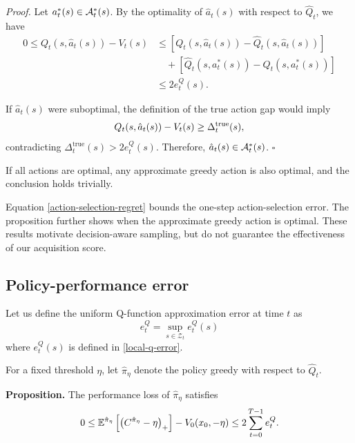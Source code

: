 \textit{Proof.}
Let $a_t^*(s)\in\mathcal{A}_t^*(s)$. By the optimality of $\hat a_t(s)$ with respect to $\hat Q_t$, we have
\begin{equation}
	\begin{array}{rl}
		0 \leq Q_t(s,\hat a_t(s))-V_t(s) &\displaystyle\leq
		\left[
		Q_t(s,\hat a_t(s))
		-\hat Q_t(s,\hat a_t(s))
		\right]\\[4pt]
		&\displaystyle\quad+
		\left[
		\hat Q_t(s,a_t^*(s))
		-Q_t(s,a_t^*(s))
		\right]\\[4pt]
		&\displaystyle\leq 2e_t^Q(s).
	\end{array}
	\label{action-selection-regret}
\end{equation}

If $\hat a_t(s)$ were suboptimal, the definition
of the true action gap would imply
\begin{equation}
	Q_t(s,\hat a_t(s))-V_t(s)
	\geq\Delta_t^{\text{true}}(s),
	\notag
\end{equation}
contradicting
$\Delta_t^{\text{true}}(s)>2e_t^Q(s)$.
Therefore,
$\hat a_t(s)\in\mathcal{A}_t^*(s)$.
\hfill$\square$

If all actions are optimal, any approximate greedy action is also optimal, and the conclusion holds trivially.

Equation \eqref{action-selection-regret} bounds the one-step action-selection error. The proposition further shows when the approximate greedy action is optimal. These results motivate decision-aware sampling, but do not guarantee the effectiveness of our acquisition score.


\subsection{Policy-performance error}
\label{method:policy-error}

Let us define the uniform Q-function approximation error
at time $t$ as
\begin{equation}
	e_t^Q = \sup_{s \in \mathcal{Z}_t} e_t^Q(s)
	\label{uniform-q-error}
\end{equation}
where $e_t^Q(s)$ is defined in \eqref{local-q-error}.

For a fixed threshold $\eta$, let $\hat{\pi}_{\eta}$ denote the policy greedy with respect to $\hat{Q}_t$.

\textbf{Proposition.}
The performance loss of $\hat{\pi}_{\eta}$ satisfies
\begin{equation}
	0 \leq \mathbb{E}^{\hat{\pi}_{\eta}} \left[ \left( C^{\hat{\pi}_{\eta}} - \eta \right)_+ \right] - V_0(x_0, -\eta) \leq 2\sum_{t=0}^{T-1} e_t^Q.
\end{equation}

